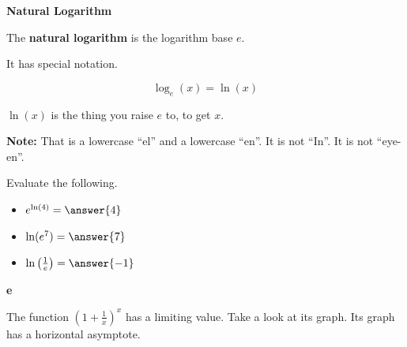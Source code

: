 \documentclass{ximera}
\begin{document}
\begin{formuala}
\begin{image}
\end{image}








\begin{definition} \textbf{\textcolor{green!50!black}{Natural Logarithm}}   


The \textbf{natural logarithm} is the logarithm base $e$.  

It has special notation.

\[
\log_e(x) = \ln(x)
\]


$\ln(x)$ is the thing you raise $e$ to, to get $x$. 


\textbf{Note:}  That is a lowercase ``el'' and a lowercase ``en''. It is not ``In''.  It is not ``eye-en''.


\end{definition}



\begin{question}


Evaluate the following.

\begin{itemize}
\item $e^{\ln(4)} = \answer{4}$ 
\item $\ln(e^7) = \answer{7}$
\item $\ln\left( \frac{1}{e} \right) = \answer{-1}$
\end{itemize}



\end{question}



\begin{remark} \textbf{\textcolor{purple!85!blue}{e}} 

The function $\left( 1 + \frac{1}{x}  \right)^{x}$ has a limiting value.  Take a look at its graph. Its graph has a horizontal asymptote. 


\end{remark}
\end{formuala}
\end{document}
